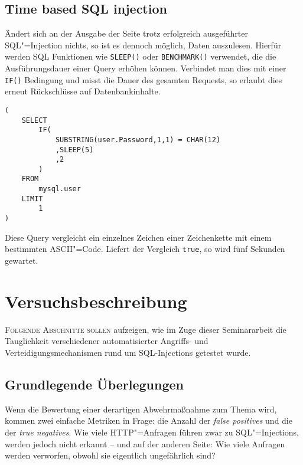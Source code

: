 \section{Time based SQL injection}

Ändert sich an der Ausgabe der Seite trotz erfolgreich ausgeführter SQL"=Injection nichts, so ist es dennoch möglich, Daten auszulesen. Hierfür werden SQL Funktionen wie \texttt{SLEEP()} oder \texttt{BENCHMARK()} verwendet, die die Ausführungsdauer einer Query erhöhen können. Verbindet man dies mit einer \texttt{IF()} Bedingung und misst die Dauer des gesamten Requests, so erlaubt dies erneut Rückschlüsse auf Datenbankinhalte.

\begin{listing}[ht!]
\begin{margincap}
\begin{verbatim}
(
    SELECT
        IF(
            SUBSTRING(user.Password,1,1) = CHAR(12)
            ,SLEEP(5)
            ,2
        )
    FROM
        mysql.user
    LIMIT
        1
)
\end{verbatim}
\caption[timebased]{Diese Query vergleicht ein einzelnes Zeichen einer Zeichenkette mit einem bestimmten ASCII"=Code. Liefert der Vergleich \texttt{true}, so wird fünf Sekunden gewartet.}
\label{lst:time_based}
\end{margincap}
\end{listing}

\chapter{Versuchsbeschreibung}

\lettrine{F}{olgende Abschnitte sollen} aufzeigen, wie im Zuge dieser Seminararbeit die Tauglichkeit verschiedener automatisierter Angriffs- und Verteidigungsmechanismen rund um SQL-Injections getestet wurde.

\section{Grundlegende Überlegungen}

Wenn die Bewertung einer derartigen Abwehrmaßnahme zum Thema wird, kommen zwei einfache Metriken in Frage: die Anzahl der \emph{false positives} und die der \emph{true negatives}. Wie viele HTTP"=Anfragen führen zwar zu SQL"=Injections, werden jedoch nicht erkannt -- und auf der anderen Seite: Wie viele Anfragen werden verworfen, obwohl sie eigentlich ungefährlich sind?

